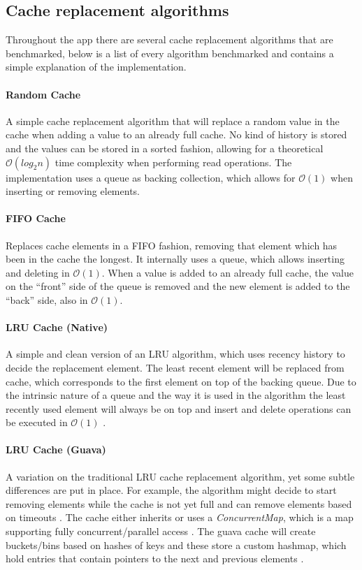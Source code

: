 \documentclass[pdftex,a4paper,12pt,twoside]{report}
\begin{document}
\subsection{Cache replacement algorithms}
\label{sec:cache_algorithms_benchmark}

Throughout the app there are several cache replacement algorithms that are benchmarked, below is a list of every algorithm benchmarked and contains a simple explanation of the implementation.
\paragraph{Random Cache} A simple cache replacement algorithm that will replace a random value in the cache when adding a value to an already full cache. No kind of history is stored and the values can be stored in a sorted fashion, allowing for a theoretical $\mathcal{O}(log_2n)$ time complexity when performing read operations. The implementation uses a queue as backing collection, which allows for $\mathcal{O}(1)$ when inserting or removing elements.
\paragraph{FIFO Cache} Replaces cache elements in a FIFO fashion, removing that element which has been in the cache the longest. It internally uses a queue, which allows inserting and deleting in $\mathcal{O}(1)$. When a value is added to an already full cache, the value on the ``front'' side of the queue is removed and the new element is added to the ``back'' side, also in $\mathcal{O}(1)$.
\paragraph{LRU Cache (Native)} A simple and clean version of an LRU algorithm, which uses recency history to decide the replacement element. The least recent element will be replaced from cache, which corresponds to the first element on top of the backing queue. Due to the intrinsic nature of a queue and the way it is used in the algorithm the least recently used element will always be on top and insert and delete operations can be executed in $\mathcal{O}(1)$ \citep{lru_cache_native}.
\paragraph{LRU Cache (Guava)} A variation on the traditional LRU cache replacement algorithm, yet some subtle differences are put in place. For example, the algorithm might decide to start removing elements while the cache is not yet full and can remove elements based on timeouts \citep{guava_cachesexplained}. The cache either inherits or uses a \emph{ConcurrentMap}, which is a map supporting fully concurrent/parallel access \citep{oracle_concurrentmap}. The guava cache will create buckets/bins based on hashes of keys and these store a custom hashmap, which hold entries that contain pointers to the next and previous elements \citep{guava_localcache}.
\end{document}
